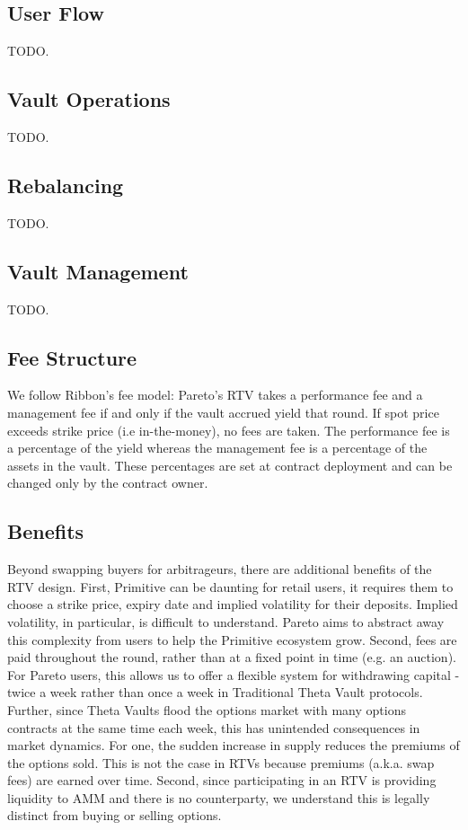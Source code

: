 \documentclass[hidelinks, 12pt]{article}
\begin{document}
\subsection{User Flow}

TODO.

\subsection{Vault Operations}

TODO.

\subsection{Rebalancing}

TODO.

\subsection{Vault Management}

TODO.

\subsection{Fee Structure}

We follow Ribbon's fee model: Pareto's RTV takes a performance fee and a management fee if and only if the vault accrued yield that round. If spot price exceeds strike price (i.e in-the-money), no fees are taken. The performance fee is a percentage of the yield whereas the management fee is a percentage of the assets in the vault. These percentages are set at contract deployment and can be changed only by the contract owner.

\subsection{Benefits}

Beyond swapping buyers for arbitrageurs, there are additional benefits of the RTV design. First, Primitive can be daunting for retail users, it requires them to choose a strike price, expiry date and implied volatility for their deposits. Implied volatility, in particular, is difficult to understand. Pareto aims to abstract away this complexity from users to help the Primitive ecosystem grow. Second, fees are paid throughout the round, rather than at a fixed point in time (e.g. an auction). For Pareto users, this allows us to offer a flexible system for withdrawing capital - twice a week rather than once a week in Traditional Theta Vault protocols. Further, since Theta Vaults flood the options market with many options contracts at the same time each week, this has unintended consequences in market dynamics. For one, the sudden increase in supply reduces the premiums of the options sold. This is not the case in RTVs because premiums (a.k.a. swap fees) are earned over time. Second, since participating in an RTV is providing liquidity to AMM and there is no counterparty, we understand this is legally distinct from buying or selling options.
\end{document}
